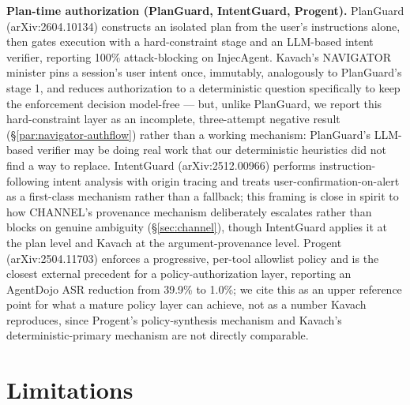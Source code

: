 \documentclass[sigconf,anonymous,review]{acmart}
\begin{document}
\begin{table}[tp]
\smallskip
\noindent\textbf{Plan-time authorization (PlanGuard, IntentGuard, Progent).}
PlanGuard (arXiv:2604.10134) constructs an isolated plan from the user's
instructions alone, then gates execution with a hard-constraint stage and an
LLM-based intent verifier, reporting 100\% attack-blocking on InjecAgent.
Kavach's NAVIGATOR minister pins a session's user intent once, immutably,
analogously to PlanGuard's stage 1, and reduces authorization to a
deterministic question specifically to keep the enforcement decision
model-free --- but, unlike PlanGuard, we report this hard-constraint layer as
an incomplete, three-attempt negative result (\S\ref{par:navigator-authflow})
rather than a working mechanism: PlanGuard's LLM-based verifier may be doing
real work that our deterministic heuristics did not find a way to replace.
IntentGuard (arXiv:2512.00966) performs instruction-following intent analysis
with origin tracing and treats user-confirmation-on-alert as a first-class
mechanism rather than a fallback; this framing is close in spirit to how
CHANNEL's provenance mechanism deliberately escalates rather than blocks on
genuine ambiguity (\S\ref{sec:channel}), though IntentGuard applies it at the
plan level and Kavach at the argument-provenance level.
Progent (arXiv:2504.11703) enforces a progressive, per-tool allowlist policy
and is the closest external precedent for a policy-authorization layer,
reporting an AgentDojo ASR reduction from 39.9\% to 1.0\%; we cite this as an
upper reference point for what a mature policy layer can achieve, not as a
number Kavach reproduces, since Progent's policy-synthesis mechanism and
Kavach's deterministic-primary mechanism are not directly comparable.
\end{table}


\section{Limitations}
\label{sec:limitations}

\end{document}
